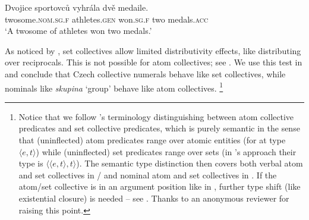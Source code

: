 \documentclass[output=paper,colorlinks,citecolor=brown,newtxmath]{langscibook}
\begin{document}
\ea\label{ex:line256-b}\label{ex:sec-sem-properties-dvojice-sportovcu}\gll Dvojice sportovců vyhrála dvě medaile.\\
 twosome.\textsc{nom.sg.f} athletes.\textsc{gen} won.\textsc{sg.f} two medals.\textsc{acc}\\
\glt `A twosome of athletes won two medals.'
\z\z

\noindent As noticed by \citet{Dotlacil2013}, set collectives allow limited distributivity effects, like distributing over reciprocals. This is not possible for atom collectives; see . We use this test in  and conclude that Czech collective numerals behave like set collectives, while nominals like \textit{skupina} `group' behave like atom collectives.%
\footnote{Notice that we follow \citeauthor{Winter2002}'s terminology distinguishing between atom collective predicates and set collective predicates, which is purely semantic in the sense that (uninflected) atom predicates range over atomic entities (for \citeauthor{Winter2002} at type $\langle e,t\rangle$) while (uninflected) set predicates range over sets (in \citeauthor{Winter2002}'s approach their type is $\langle \langle e,t\rangle, t \rangle$). The semantic type distinction then covers both verbal atom and set collectives in / and nominal atom and set collectives in . If the atom/set collective is in an argument position like in , further type shift (like existential closure) is needed -- see  . Thanks to an anonymous reviewer for raising this point.}

\ea\label{ex:line268} 
\z\z

\ea\label{ex:line271} 
\z\z
\end{document}
